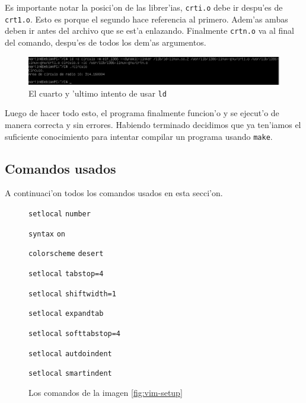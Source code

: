 \documentclass[11pt]{article}
\newcommand{\codetext}[2]{{\Large \texttt{\textcolor{#1}{#2}}}}
\newcommand{\imagecaption}[1]{\caption*{Los comandos de la imagen \ref{fig:#1}}}
\begin{document}
		Es importante notar la posici'on de las librer'ias, \texttt{crti.o} debe ir despu'es de \texttt{crt1.o}. Esto es porque el segundo hace referencia al primero. Adem'as ambas deben ir antes del archivo que se est'a enlazando. Finalmente \texttt{crtn.o} va al final del comando, despu'es de todos los dem'as argumentos.
		
		\begin{figure}[H]
			\centering
			\includegraphics[width=.9\linewidth]{Images/Seccion 1/S1 parte nueve.PNG}
			\caption{El cuarto y 'ultimo intento de usar \texttt{ld}}
			\label{fig:fourth-ld-attempt}
		\end{figure}
		
		Luego de hacer todo esto, el programa finalmente funcion'o y se ejecut'o de manera correcta y sin errores. Habiendo terminado decidimos que ya ten'iamos el suficiente conocimiento para intentar compilar un programa usando \texttt{make}.
		
	\subsection{Comandos usados}
		A continuaci'on todos los comandos usados en esta secci'on.
		
		\begin{figure}[H]
			\centering
			\begin{code-box}
				\codetext{light-blue}{setlocal} \codetext{light-red}{number}
				
				\codetext{light-blue}{syntax} \codetext{light-red}{on}

				\codetext{light-blue}{colorscheme} \codetext{light-red}{desert}
				
				\codetext{light-blue}{setlocal} \codetext{light-red}{tabstop=4}

				\codetext{light-blue}{setlocal} \codetext{light-red}{shiftwidth=1}
				
				\codetext{light-blue}{setlocal} \codetext{light-red}{expandtab}
				
				\codetext{light-blue}{setlocal} \codetext{light-red}{softtabstop=4}
				
				\codetext{light-blue}{setlocal} \codetext{light-red}{autdoindent}
				
				\codetext{light-blue}{setlocal} \codetext{light-red}{smartindent}
			\end{code-box}
			\imagecaption{vim-setup}
		\end{figure}
		
\end{document}
